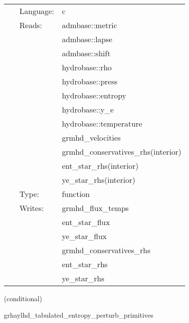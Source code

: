  \begin{tabular*}{160mm}{cll} 
~ & Language:  & c \\ 
~ & Reads:  & admbase::metric \\ 
~& ~ &admbase::lapse\\ 
~& ~ &admbase::shift\\ 
~& ~ &hydrobase::rho\\ 
~& ~ &hydrobase::press\\ 
~& ~ &hydrobase::entropy\\ 
~& ~ &hydrobase::y\_e\\ 
~& ~ &hydrobase::temperature\\ 
~& ~ &grmhd\_velocities\\ 
~& ~ &grmhd\_conservatives\_rhs(interior)\\ 
~& ~ &ent\_star\_rhs(interior)\\ 
~& ~ &ye\_star\_rhs(interior)\\ 
~ & Type:  & function \\ 
~ & Writes:  & grmhd\_flux\_temps \\ 
~& ~ &ent\_star\_flux\\ 
~& ~ &ye\_star\_flux\\ 
~& ~ &grmhd\_conservatives\_rhs\\ 
~& ~ &ent\_star\_rhs\\ 
~& ~ &ye\_star\_rhs\\ 
\end{tabular*} 


\vspace{5mm}

   (conditional) 

\hspace{5mm} grhaylhd\_tabulated\_entropy\_perturb\_primitives 

\hspace{5mm}{\it entropy+tabulated version of grhaylhd\_perturb\_primitives } 


\hspace{5mm}

